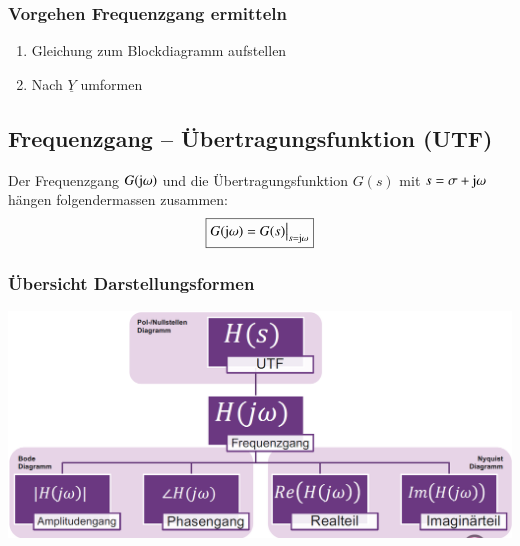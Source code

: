 \subsubsection{Vorgehen Frequenzgang ermitteln}
\begin{enumerate}
    \item Gleichung zum Blockdiagramm aufstellen
    \item Nach $\underline{Y}$ umformen 
\end{enumerate}

\subsection{Frequenzgang -- Übertragungsfunktion (UTF)}

Der Frequenzgang $G(\mathrm{j} \omega)$ und die Übertragungsfunktion $G(s)$ mit $s = \sigma + \mathrm{j} \omega$ hängen folgendermassen zusammen:
$$ \boxed{G(\mathrm{j} \omega) = G(s) \big\vert_{s = \mathrm{j} \omega}} $$

\subsubsection{Übersicht Darstellungsformen}

\begin{center}
    \includegraphics[width=0.75\columnwidth]{images/darstellungen_frequenzgang_utf.png}
\end{center}

